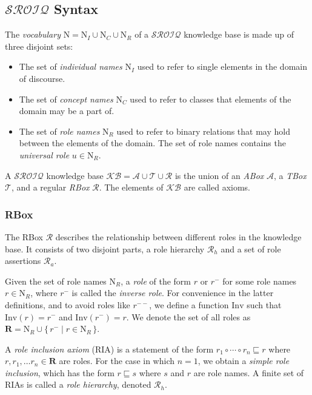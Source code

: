 
\subsection{$\mathcal{SROIQ}$ Syntax}

The \emph{vocabulary} $\mathrm{N} = \mathrm{N}_I \cup \mathrm{N}_C \cup \mathrm{N}_R$ of a $\mathcal{SROIQ}$ knowledge base is made up of three disjoint sets:

\begin{itemize}
    \item The set of \emph{individual names} $\mathrm{N}_I$ used to refer to single elements in the domain of discourse.
    \item The set of \emph{concept names} $\mathrm{N}_C$ used to refer to classes that elements of the domain may be a part of.
    \item The set of \emph{role names} $\mathrm{N}_R$ used to refer to binary relations that may hold between the elements of the domain. The set of role names contains the \emph{universal role} $u \in \mathrm{N}_R$.
\end{itemize}

A $\mathcal{SROIQ}$ knowledge base $\mathcal{KB} = \mathcal{A} \cup \mathcal{T} \cup \mathcal{R}$ is the union of an \emph{ABox} $\mathcal{A}$, a \emph{TBox} $\mathcal{T}$, and a regular \emph{RBox} $\mathcal{R}$. The elements of $\mathcal{KB}$ are called axioms.

\subsubsection{RBox}

The RBox $\mathcal{R}$ describes the relationship between different roles in the knowledge base. It consists of two disjoint parts, a role hierarchy $\mathcal{R}_h$ and a set of role assertions $\mathcal{R}_a$.

Given the set of role names $\mathrm{N}_R$, a \emph{role} of the form $r$ or $r^-$ for some role names $r \in \mathrm{N}_R$, where $r^-$ is called the \emph{inverse role}. For convenience in the latter definitions, and to avoid roles like $r^{--}$, we define a function $\mathrm{Inv}$ such that $\mathrm{Inv}(r) = r^-$ and $\mathrm{Inv}(r^-) = r$. We denote the set of all roles as $\mathbf{R} = \mathrm{N}_R \cup \{ \, r^- \mid r \in \mathrm{N}_R \, \}$.

A \emph{role inclusion axiom} (RIA) is a statement of the form $r_1 \circ \cdots \circ r_n \sqsubseteq r$ where $r, r_1, \dots r_n \in \mathbf{R}$ are roles. For the case in which $n = 1$, we obtain a \emph{simple role inclusion}, which has the form $r \sqsubseteq s$ where $s$ and $r$ are role names. A finite set of RIAs is called a \emph{role hierarchy}, denoted $\mathcal{R}_h$.

